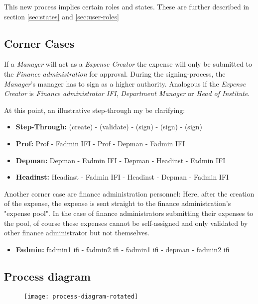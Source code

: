 This new process implies certain roles and states. These are further described in section \ref{sec:states} and \ref{sec:user-roles}
\newline


\subsection{Corner Cases}
If a \textit{Manager} will act as a \textit{Expense Creator} the expense will only be submitted to the \textit{Finance administration} for approval. During the signing-process, the \textit{Manager}'s manager has to sign as a higher authority.\newline
Analogous if the \textit{Expense Creator} is \textit{Finance administrator IFI}, \textit{Department Manager} or \textit{Head of Institute}.\par 
At this point, an illustrative step-through my be clarifying:
	
	\begin{itemize}
		\item \textbf{Step-Through:} (create) - (validate) - (sign) - (sign) - (sign)
		\item \textbf{Prof:} Prof - Fadmin IFI - Prof - Depman - Fadmin IFI
		\item \textbf{Depman:} Depman - Fadmin IFI - Depman - Headinst  - Fadmin IFI
		\item \textbf{Headinst:} Headinst - Fadmin IFI - Headinst - Depman - Fadmin IFI	
	\end{itemize}
	
Another corner case are finance administration personnel: Here, after the creation of the expense, the expense is sent straight to the finance administration's "expense pool". In the case of finance administrators submitting their expenses to the pool, of course these expenses cannot be self-assigned and only validated by other finance administrator but not themselves.

\begin{itemize}
	\item \textbf{Fadmin:} fadmin1 ifi - fadmin2 ifi - fadmin1 ifi - depman - fadmin2 ifi
\end{itemize}


\newpage
\subsection{Process diagram}
\label{sec:process-diagram-rotated}
	\begin{figure}[H]
		{\texttt{[image: process-diagram-rotated]}}
	\end{figure}
\newpage


